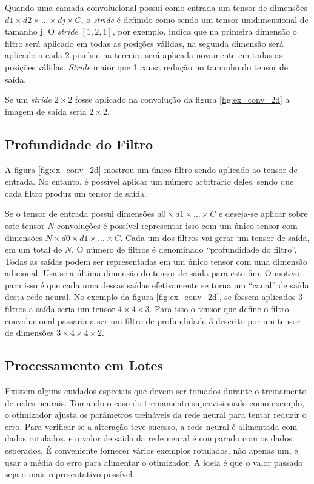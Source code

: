 Quando uma camada convolucional possui como entrada um tensor de dimensões
$d1\times d2 \times ... \times dj \times C$, o \emph{stride} é definido como
sendo um tensor unidimensional de tamanho j.
O \emph{stride} $[1,2,1]$, por exemplo, indica que na primeira dimensão o
filtro será aplicado em todas as posições válidas, na segunda dimensão será
aplicado a cada 2 pixels e na terceira será aplicada novamente em todas as
posições válidas. \emph{Stride} maior que 1 causa redução no tamanho do
tensor de saída.

Se um \emph{stride} $2 \times 2$ fosse aplicado na convolução da figura
\ref{fig:ex_conv_2d} a imagem de saída seria $2 \times 2$.

\subsection{Profundidade do Filtro}
A figura \ref{fig:ex_conv_2d} mostrou um único filtro sendo aplicado ao
tensor de entrada. No entanto, é possível aplicar um número arbitrário
deles, sendo que cada filtro produz um tensor de saída.

Se o tensor de entrada possui dimensões $d0 \times d1 \times ... \times C$
e deseja-se aplicar sobre este
tensor $N$ convoluções é possível representar isso com um único tensor
com dimensões
$N \times d0 \times d1 \times ... \times C$. Cada um dos filtros vai gerar
um tensor de saída, em um total de $N$. O
número de filtros é denominado “profundidade do filtro”. Todas as saídas podem
ser representadas em um único tensor com uma dimensão adicional. Usa-se a última
dimensão do tensor de saída para este fim. O motivo para isso é que cada uma
dessas saídas efetivamente se torna um “canal” de saída desta rede neural. No
exemplo da figura \ref{fig:ex_conv_2d}, se fossem aplicados 3 filtros a saída
seria um tensor $4 \times 4 \times 3$. Para isso o tensor que define o filtro
convolucional passaria a ser um
filtro de profundidade 3 descrito por um tensor de dimensões
$3 \times 4 \times 4 \times 2$.

\subsection{Processamento em Lotes}
Existem alguns cuidados especiais que devem ser tomados durante o treinamento de
redes neurais. Tomando o caso do treinamento supervisionado como exemplo, o
otimizador ajusta os parâmetros treináveis da rede neural para tentar reduzir o
erro. Para verificar se a alteração teve sucesso, a rede neural é
alimentada com
dados rotulados, e o valor de saída da rede neural é comparado com os dados
esperados. É conveniente fornecer vários exemplos rotulados, não apenas um, e
usar a média do erro para alimentar o otimizador. A ideia é que o valor passado
seja o mais representativo possível.

